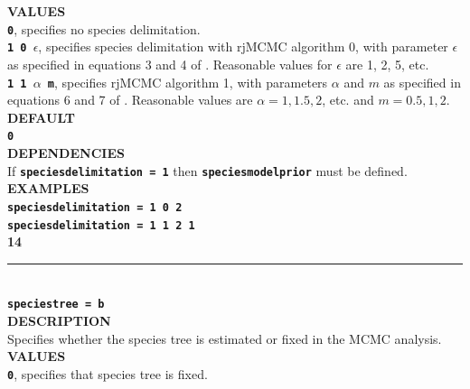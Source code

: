 \documentclass[a4paper]{book}
\numberwithin{equation}{section} \renewcommand{\baselinestretch}{0.55}
\begin{document}
\textbf{VALUES} \vspace{5pt}\\
\textbf{\texttt{0}}, specifies no species delimitation. \vspace{5pt}\\
\textbf{\texttt{1 0 $\epsilon$}}, specifies species delimitation with rjMCMC algorithm 0, with parameter $\epsilon$ as specified in equations 3 and 4 of \cite{Yang2010}.  Reasonable values for $\epsilon$ are 1, 2, 5, etc. \vspace{5pt}\\
\textbf{\texttt{1 1 $\alpha$ m}}, specifies rjMCMC algorithm 1, with
parameters $ \alpha$ and $m$ as specified in equations 6 and 7 of
\cite{Yang2010}. Reasonable values are $\alpha = 1, 1.5, 2$, etc. and $m = 0.5, 1, 2$. \vspace{5pt}\\
\textbf{DEFAULT} \vspace{5pt}\\
\textbf{\texttt{0}} \vspace{5pt}\\
\textbf{DEPENDENCIES} \vspace{5pt}\\
If \textbf{\texttt{speciesdelimitation = 1}} then \textbf{\texttt{speciesmodelprior}} must be defined. \vspace{5pt}\\
\textbf{EXAMPLES} \vspace{5pt}\\
\textbf{\texttt{speciesdelimitation = 1 0 2}} \vspace{5pt}\\
\textbf{\texttt{speciesdelimitation = 1 1 2 1}}\vspace{10pt}\\
\textbf{{\large 14}} \\
\noindent\rule{\textwidth}{0.8pt} \\
\textbf{{\Large \texttt{speciestree = b}}} \vspace{5pt}\\
\textbf{DESCRIPTION} \vspace{5pt}\\
Specifies whether the species tree is estimated or fixed in the MCMC
analysis.
\vspace{5pt}\\
\textbf{VALUES} \vspace{5pt}\\
\textbf{\texttt{0}}, specifies that species tree is fixed.  \vspace{5pt}\\
\end{document}
